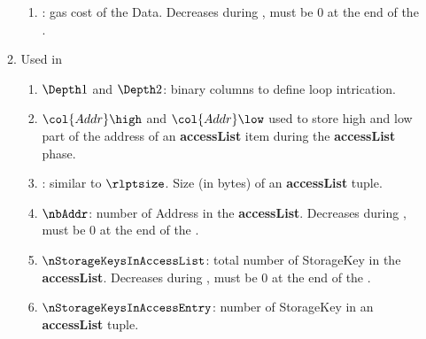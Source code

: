 \begin{enumerate}
\begin{enumerate}
\begin{enumerate}
                    \item \dataGasCost{}:
                        gas cost of the Data. Decreases during \phaseData{}, must be 0 at the end of the \phaseData{}.
                \end{enumerate}
            \item Used in \phaseAccessList{} 
                \begin{enumerate}
                    \item $\Depth1$ and $\Depth2$:
                        binary columns to define loop intrication.
                    \item $\col{Addr}\high$ and $\col{Addr}\low$ used to store high and low part of the address of an \textbf{accessList} item during the \textbf{accessList} phase.
                    \item {}:
                        similar to $\rlptsize$. Size (in bytes) of an \textbf{accessList} tuple.
                    \item $\nbAddr$:
                        number of Address in the \textbf{accessList}. Decreases during \phaseAccessList{}, must be 0 at the end of the \phaseAccessList{}.
                    \item $\nStorageKeysInAccessList$:
                        total number of StorageKey in the \textbf{accessList}. Decreases during \phaseAccessList{}, must be 0 at the end of the \phaseAccessList{}.
                    \item $\nStorageKeysInAccessEntry$:
                        number of StorageKey in an \textbf{accessList} tuple.
                \end{enumerate}
        \end{enumerate}
\end{enumerate}
